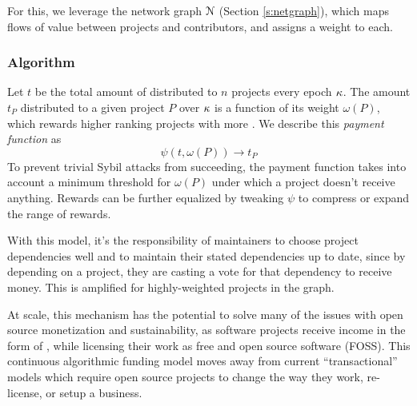 
For this, we leverage the \oscoin{} network graph $\mathcal{N}$ (Section
\ref{s:netgraph}), which maps flows of value between projects and contributors,
and assigns a weight to each.

\subsubsection{Algorithm} Let $t$ be the total amount of \oscoin{} distributed
to $n$ projects every epoch $\kappa$. The amount $t_P$ distributed to a given
project $P$ over $\kappa$ is a function of its \osrank{} weight $\omega(P)$,
which rewards higher ranking projects with more \oscoin{}. We describe this
\emph{payment function} as
\[
    \psi(t, \omega(P)) \to t_P
\]
To prevent trivial Sybil attacks from succeeding, the payment function takes
into account a minimum threshold for $\omega(P)$ under which a project doesn't
receive anything. Rewards can be further equalized by tweaking $\psi$ to
compress or expand the range of rewards.

With this model, it’s the responsibility of maintainers to choose project
dependencies well and to maintain their stated dependencies up to date, since
by depending on a project, they are casting a vote for that dependency to
receive money.  This is amplified for highly-weighted projects in the graph.

At scale, this mechanism has the potential to solve many of the issues with
open source monetization and sustainability, as software projects receive
income in the form of \oscoin{}, while licensing their work as free and
open source software (FOSS). This continuous algorithmic funding model moves
away from current ``transactional'' models which require open source projects
to change the way they work, re-license, or setup a business.
